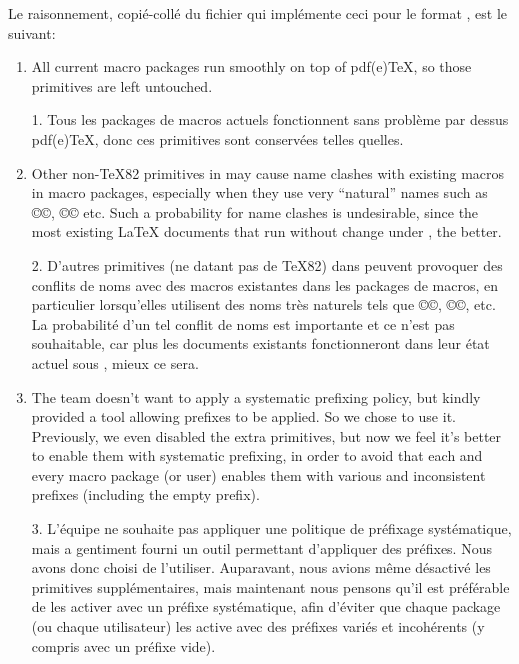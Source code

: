 \documentclass{lltxdoc}
\begin{document}
Le raisonnement, copié-collé du fichier  qui implémente
ceci pour le format , est le suivant:

\begin{myquote}
  \begin{enumerate}
    \item All current macro packages run smoothly on top of pdf(e)TeX, so
      those primitives are left untouched.

1. Tous les packages de macros actuels fonctionnent sans problème par dessus pdf(e)TeX, donc ces primitives sont conservées telles quelles.


    \item Other non-TeX82 primitives in \luatex may cause name clashes with
      existing macros in macro packages, especially when they use very
      ``natural'' names such as ©\outputbox©, ©\mathstyle© etc. Such a
      probability for name clashes is undesirable, since the most existing
      LaTeX documents that run without change under \luatex, the better.

2. D'autres primitives (ne datant pas de TeX82) dans \luatex peuvent provoquer des conflits de noms avec des macros existantes dans les packages de macros, en particulier lorsqu'elles utilisent des noms très \og{}naturels\fg{} tels que ©\outputbox©, ©\mathstyle©, etc. La probabilité d'un tel conflit de noms est importante et ce n'est pas souhaitable, car plus les documents \latex existants fonctionneront dans leur état actuel sous \luatex, mieux ce sera.


    \item The \luatex team doesn't want to apply a systematic prefixing policy,
      but kindly provided a tool allowing prefixes to be applied. So we chose
      to use it.  Previously, we even disabled the extra primitives, but now
      we feel it's better to enable them with systematic prefixing, in order
      to avoid that each and every macro package (or user) enables them with
      various and inconsistent prefixes (including the empty prefix).

3. L'équipe \luatex ne souhaite pas appliquer une politique de préfixage systématique, mais a gentiment fourni un outil permettant d'appliquer des préfixes. Nous avons donc choisi de l'utiliser. Auparavant, nous avions même désactivé les primitives supplémentaires, mais maintenant nous pensons qu'il est préférable de les activer avec un préfixe systématique, afin d'éviter que chaque package (ou chaque utilisateur) les active avec des préfixes variés et incohérents (y compris avec un préfixe vide).


\end{enumerate}
\end{myquote}
\end{document}
